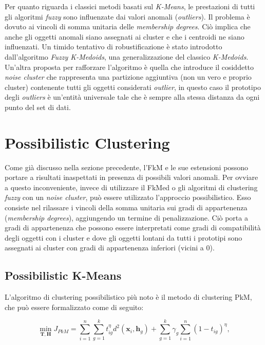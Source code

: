 \documentclass[12pt]{article}
\begin{document}
Per quanto riguarda i classici metodi basati sul \textit{K-Means}, le prestazioni di tutti gli algoritmi \textit{fuzzy} sono influenzate dai valori anomali (\textit{outliers}). Il problema è dovuto ai vincoli di somma unitaria delle \textit{membership degrees}. Ciò implica che anche gli oggetti anomali siano assegnati ai cluster e che i centroidi ne siano influenzati. Un timido tentativo di robustificazione è stato introdotto dall'algoritmo \textit{Fuzzy K-Medoids}, una generalizzazione del classico \textit{K-Medoids}. Un'altra proposta per rafforzare l'algoritmo
è quella che introduce il cosiddetto \textit{noise cluster} che rappresenta una partizione aggiuntiva (non un vero e proprio cluster) contenente tutti gli oggetti considerati \textit{outlier}, in questo caso il prototipo degli \textit{outliers} è un'entità universale tale che è sempre alla stessa distanza da ogni punto del set di dati.

\section{Possibilistic Clustering}

Come già discusso nella sezione precedente, l'FkM e le sue estensioni possono portare a risultati inaspettati in presenza di possibili valori anomali. Per ovviare a questo inconveniente, invece di utilizzare il FkMed o gli algoritmi di clustering \textit{fuzzy} con un \textit{noise cluster},
può essere utilizzato l'approccio possibilistico. Esso consiste nel rilassare i vincoli della somma unitaria sui gradi di appartenenza (\textit{membership degrees}), aggiungendo un termine di penalizzazione. Ciò porta a gradi di appartenenza che possono essere interpretati come
gradi di compatibilità degli oggetti con i cluster e dove gli oggetti lontani da tutti i prototipi sono assegnati ai cluster con gradi di appartenenza inferiori (vicini a 0).

\subsection{Possibilistic K-Means}

L'algoritmo di clustering possibilistico più noto è il metodo di clustering PkM, che può essere formalizzato come di seguito:

\begin{equation}
	\min_{\mathbf{T},\mathbf{H}} J_{PkM} = \sum_{i=1}^{n}\sum_{g=1}^{k} t_{ig}^{\eta}d^{2}(\mathbf{x}_{i},\mathbf{h}_{g}) + \sum_{g=1}^{k} \gamma_g\sum_{i=1}^{n}(1-t_{ig})^{\eta},	
	\label{eq:4}
\end{equation}
\end{document}
